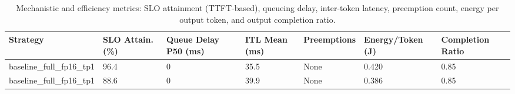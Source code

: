 \begin{table}
\caption{Mechanistic and efficiency metrics: SLO attainment (TTFT-based), queueing delay, inter-token latency, preemption count, energy per output token, and output completion ratio.}
\label{tab:efficiency}
\begin{tabular}{lllllll}
\toprule
Strategy & SLO Attain. (\%) & Queue Delay P50 (ms) & ITL Mean (ms) & Preemptions & Energy/Token (J) & Completion Ratio \\
\midrule
baseline\_full\_fp16\_tp1 & 96.4 & 0 & 35.5 & None & 0.420 & 0.85 \\
baseline\_full\_fp16\_tp1 & 88.6 & 0 & 39.9 & None & 0.386 & 0.85 \\
\bottomrule
\end{tabular}
\end{table}
